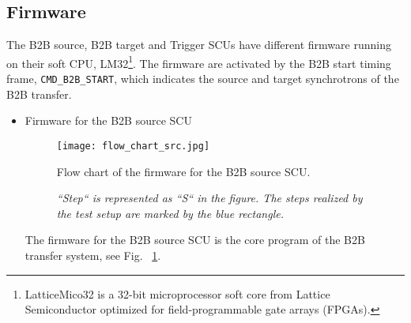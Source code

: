 \subsection{Firmware}

The B2B source, B2B target and Trigger SCUs have different firmware running on their soft \gls{CPU}, LM32\footnote{LatticeMico32 is a 32-bit microprocessor soft core from Lattice Semiconductor optimized for field-programmable gate arrays (\gls{FPGA}s).}. The firmware are activated by the  B2B start timing frame, \verb|CMD_B2B_START|, which indicates the source and target synchrotrons of the B2B transfer. 
\begin{itemize}
\item Firmware for the B2B source SCU
\begin{figure}[!htb]
   \centering   
   \texttt{[image: flow\_chart\_src.jpg]}
   \caption{Flow chart of the firmware for the B2B source SCU.}
   \caption*{\textsl{\small{``Step`` is represented as ``S`` in the figure. The steps realized by the test setup are marked by the blue rectangle. }}}
   \label{flow_chart_src}
\end{figure}

The firmware for the B2B source SCU is the core program of the B2B transfer system, see Fig. ~\ref{flow_chart_src}. 


\end{itemize}
